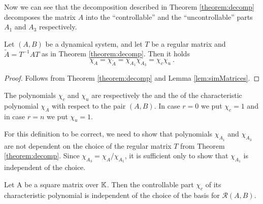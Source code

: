 Now we can see that the decomposition described in Theorem \ref{theorem:decomp} decomposes the matrix $A$ into the ``controllable'' and the ``uncontrollable'' parts $A_1$ and $A_3$ respectively.

\begin{cor}
	Let $(A,B)$ be a dynamical system, and let $T$ be a regular matrix and $\widetilde{A}=T^{-1}AT$ as in Theorem \ref{theorem:decomp}. Then it holds
	$$\chi_A=\chi_{\widetilde{A}}=\chi_{A_1}\chi_{A_3}=\chi_c\chi_u\ .$$
\end{cor} 

\begin{proof}
	Follows from Theorem \ref{theorem:decomp} and Lemma \ref{lem:simMatrices}.
\end{proof}

\begin{definition}
	The polynomials $\chi_c$ and $\chi_u$ are respectively the  and the  of the characteristic polynomial $\chi_A$ with respect to the pair $(A,B)$. In case $r=0$ we put $\chi_c=1$ and in case $r=n$ we put $\chi_u=1$.
\end{definition}

For this definition to be correct, we need to show that polynomials $\chi_{A_1}$ and $\chi_{A_3}$ are not dependent on the choice of the regular matrix $T$ from Theorem \ref{theorem:decomp}. Since $\chi_{A_3}=\chi_A/\chi_{A_1}$, it is sufficient only to show that $\chi_{A_1}$ is independent of the choice.

\begin{lemma}
	Let A be a square matrix over $\mathbb{K}$. Then the controllable part $\chi_c$ of its characteristic polynomial is independent of the choice of the basis for $\mathcal{R}(A,B)$.
\end{lemma}

